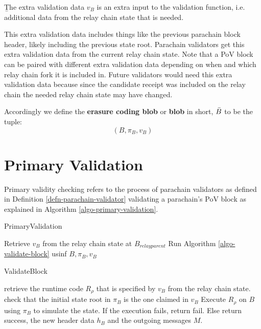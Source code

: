 \begin{definition}  \label{defn-extra-validation-data}
  {\b The extra validation data} $v_B$  is an extra input to the validation function, i.e. additional data from the relay chain state that is needed.
\end{definition}
This extra validation data includes things like the previous parachain block header, likely including the previous state root.
Parachain validators get this extra validation data from the current relay chain state. Note that a PoV block can be paired with different extra validation data depending on when and which relay chain fork it is included in. Future validators would need this extra validation data because since the candidate receipt was included on the relay chain the needed relay chain state may have changed. 

\begin{definition}
  \label{defn-blob}
  Accordingly we define the {\bf erasure coding blob} or {\bf blob} in short, {\bf $\bar{B}$} to be the tuple:
  \[
  (B, \pi_B, v_B)
  \]
\end{definition}

\section{Primary Validation}
\label{sect-primary-validation}

Primary validity checking refers to the process of parachain validators as defined in Definition \ref{defn-parachain-validator} validating a parachain's PoV block as explained in Algorithm \ref{algo-primary-validation}.

\begin{algorithm}
  \caption[]{\sc PrimaryValidation}
  \label{algo-primary-validation}
  \begin{algorithmic}[1]
    
    \State Retrieve $v_B$ from the relay chain state at $B_{relay parent}$
    \State Run Algorithm \ref{algo-validate-block} usinf $B, \pi_B, v_B$
  \end{algorithmic}
\end{algorithm}

\begin{algorithm}
  \caption[]{\sc ValidateBlock}
  \label{algo-validate-block}
  \begin{algorithmic}[1]
    \State retrieve the runtime code $R_\rho$ that is specified by $v_B$ from the relay chain state.
    \State check that the initial state root in $\pi_B$ is the one claimed in $v_B$
    \State Execute $R_\rho$ on $B$ using $\pi_B$ to simulate the state.    
    \State If the execution fails, return fail.
    \State Else return success, the new header data $h_B$ and the outgoing messages $M$.
  \end{algorithmic}
\end{algorithm}

